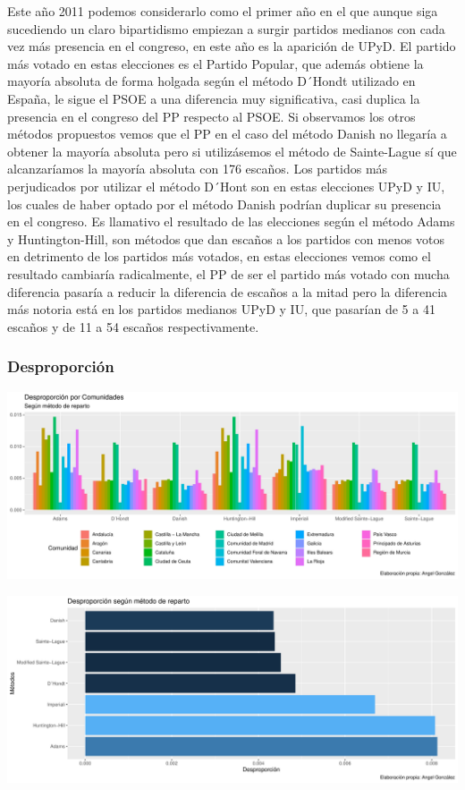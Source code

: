 \documentclass[12pt,a4paper,]{book}
\numberwithin{dummy}{section}
\theoremstyle{ocrenumbox}
\theoremstyle{blacknumex}
\theoremstyle{blacknumbox}
\theoremstyle{ocrenum}
\theoremstyle{ocrenum}
\begin{document}
Este año 2011 podemos considerarlo como el primer año en el que aunque
siga sucediendo un claro bipartidismo empiezan a surgir partidos
medianos con cada vez más presencia en el congreso, en este año es la
aparición de UPyD. El partido más votado en estas elecciones es el
Partido Popular, que además obtiene la mayoría absoluta de forma holgada
según el método D´Hondt utilizado en España, le sigue el PSOE a una
diferencia muy significativa, casi duplica la presencia en el congreso
del PP respecto al PSOE. Si observamos los otros métodos propuestos
vemos que el PP en el caso del método Danish no llegaría a obtener la
mayoría absoluta pero si utilizásemos el método de Sainte-Lague sí que
alcanzaríamos la mayoría absoluta con 176 escaños. Los partidos más
perjudicados por utilizar el método D´Hont son en estas elecciones UPyD
y IU, los cuales de haber optado por el método Danish podrían duplicar
su presencia en el congreso. Es llamativo el resultado de las elecciones
según el método Adams y Huntington-Hill, son métodos que dan escaños a
los partidos con menos votos en detrimento de los partidos más votados,
en estas elecciones vemos como el resultado cambiaría radicalmente, el
PP de ser el partido más votado con mucha diferencia pasaría a reducir
la diferencia de escaños a la mitad pero la diferencia más notoria está
en los partidos medianos UPyD y IU, que pasarían de 5 a 41 escaños y de
11 a 54 escaños respectivamente.

\hypertarget{desproporciuxf3n-10}{%
\subsubsection{Desproporción}\label{desproporciuxf3n-10}}

\begin{center}\includegraphics[width=0.95\linewidth]{figurasR/unnamed-chunk-153-1} \end{center}

\begin{center}\includegraphics[width=0.95\linewidth]{figurasR/unnamed-chunk-153-2} \end{center}
\end{document}
